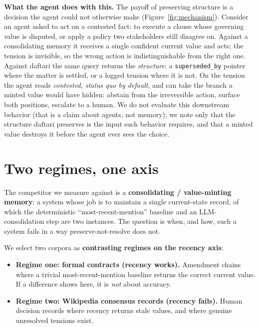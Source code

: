 \documentclass[11pt]{article}
\begin{document}
\textbf{What the agent does with this.} The payoff of preserving structure is a decision the agent
could not otherwise make (Figure~\ref{fig:mechanism}). Consider an agent asked to act on a contested fact: to execute a
clause whose governing value is disputed, or apply a policy two stakeholders still disagree
on. Against a consolidating memory it receives a single confident current value and acts; the
tension is invisible, so the wrong action is indistinguishable from the right one. Against
daftari the same query returns the \emph{structure}: a \texttt{superseded\_by} pointer where the matter is
settled, or a logged tension where it is not. On the tension the agent reads \emph{contested,
status quo by default}, and can take the branch a minted value would have hidden: abstain from
the irreversible action, surface both positions, escalate to a human. We do not evaluate this
downstream behavior (that is a claim about agents, not memory); we note only that the structure
daftari preserves is the input such behavior requires, and that a minted value destroys it
before the agent ever sees the choice.

\section{Two regimes, one axis}
\label{sec:regimes}

The competitor we measure against is a \textbf{consolidating / value-minting memory}: a system
whose job is to maintain a single current-state record, of which the deterministic
``most-recent-mention'' baseline and an LLM-consolidation step are two instances. The question
is when, and how, such a system fails in a way preserve-not-resolve does not.

We select two corpora as \textbf{contrasting regimes on the recency axis}:

\begin{itemize}
\item \textbf{Regime one: formal contracts (recency works).} Amendment chains where a trivial
  most-recent-mention baseline returns the correct current value. If a difference shows here,
  it is \emph{not} about accuracy.
\item \textbf{Regime two: Wikipedia consensus records (recency fails).} Human decision records where
  recency returns stale values, and where genuine unresolved tensions exist.
\end{itemize}
\end{document}
